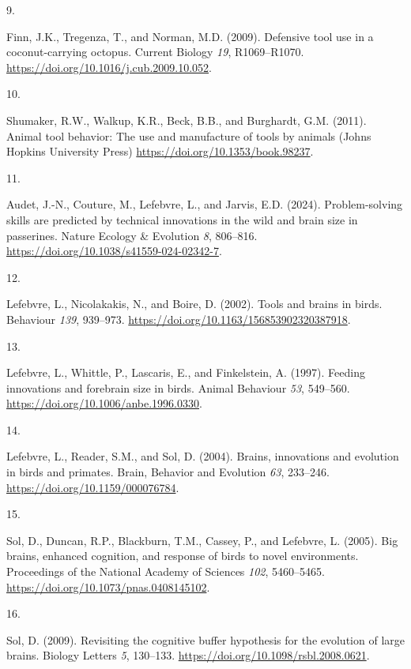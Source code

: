 \documentclass[
  man, donotrepeattitle,floatsintext]{apa6}
\newlength{\cslhangindent}
\newlength{\csllabelwidth}
\newlength{\cslentryspacingunit} %
\newenvironment{CSLReferences}[2] %
 {%
  \setlength{\parindent}{0pt}
  \ifodd #1
  \let\oldpar\par
  \def\par{\hangindent=\cslhangindent\oldpar}
  \fi
  \setlength{\parskip}{#2\cslentryspacingunit}
 }%
 {}
\newcommand{\CSLLeftMargin}[1]{\parbox[t]{\csllabelwidth}{#1}}
\newcommand{\CSLRightInline}[1]{\parbox[t]{\linewidth - \csllabelwidth}{#1}\break}
\begin{document}
\begin{CSLReferences}{0}{0}
\leavevmode{}%
\CSLLeftMargin{9. }%
\CSLRightInline{Finn, J.K., Tregenza, T., and Norman, M.D. (2009). Defensive tool use in a coconut-carrying octopus. Current Biology \emph{19}, R1069--R1070. \url{https://doi.org/10.1016/j.cub.2009.10.052}.}

\leavevmode{}%
\CSLLeftMargin{10. }%
\CSLRightInline{Shumaker, R.W., Walkup, K.R., Beck, B.B., and Burghardt, G.M. (2011). Animal tool behavior: The use and manufacture of tools by animals (Johns Hopkins University Press) \url{https://doi.org/10.1353/book.98237}.}

\leavevmode{}%
\CSLLeftMargin{11. }%
\CSLRightInline{Audet, J.-N., Couture, M., Lefebvre, L., and Jarvis, E.D. (2024). Problem-solving skills are predicted by technical innovations in the wild and brain size in passerines. Nature Ecology \& Evolution \emph{8}, 806--816. \url{https://doi.org/10.1038/s41559-024-02342-7}.}

\leavevmode{}%
\CSLLeftMargin{12. }%
\CSLRightInline{Lefebvre, L., Nicolakakis, N., and Boire, D. (2002). Tools and brains in birds. Behaviour \emph{139}, 939--973. \url{https://doi.org/10.1163/156853902320387918}.}

\leavevmode{}%
\CSLLeftMargin{13. }%
\CSLRightInline{Lefebvre, L., Whittle, P., Lascaris, E., and Finkelstein, A. (1997). Feeding innovations and forebrain size in birds. Animal Behaviour \emph{53}, 549--560. \url{https://doi.org/10.1006/anbe.1996.0330}.}

\leavevmode{}%
\CSLLeftMargin{14. }%
\CSLRightInline{Lefebvre, L., Reader, S.M., and Sol, D. (2004). Brains, innovations and evolution in birds and primates. Brain, Behavior and Evolution \emph{63}, 233--246. \url{https://doi.org/10.1159/000076784}.}

\leavevmode{}%
\CSLLeftMargin{15. }%
\CSLRightInline{Sol, D., Duncan, R.P., Blackburn, T.M., Cassey, P., and Lefebvre, L. (2005). Big brains, enhanced cognition, and response of birds to novel environments. Proceedings of the National Academy of Sciences \emph{102}, 5460--5465. \url{https://doi.org/10.1073/pnas.0408145102}.}

\leavevmode{}%
\CSLLeftMargin{16. }%
\CSLRightInline{Sol, D. (2009). Revisiting the cognitive buffer hypothesis for the evolution of large brains. Biology Letters \emph{5}, 130--133. \url{https://doi.org/10.1098/rsbl.2008.0621}.}


\end{CSLReferences}
\end{document}
